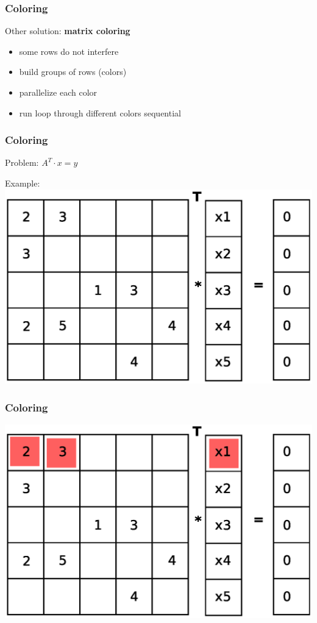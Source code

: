\documentclass{beamer}
\begin{document}
\begin{frame}
\frametitle{Coloring}
Other solution: \textbf{matrix coloring}
\begin{itemize}
\item some rows do not interfere
\item build groups of rows (colors)
\item parallelize each color
\item run loop through different colors sequential
\end{itemize}
\end{frame}

\begin{frame}
\frametitle{Coloring}
Problem: $A^T \cdot x= y$

Example:
\includegraphics[width=0.9\linewidth]{graphic/coloringT2.eps}
\end{frame}

\begin{frame}
\frametitle{Coloring}
\includegraphics[width=0.8\linewidth]{graphic/coloringT3.eps}
\end{frame}
\end{document}
